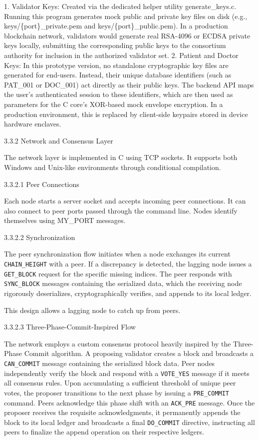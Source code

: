 \documentclass[12pt]{article}
\begin{document}
1. Validator Keys: Created via the dedicated helper utility generate\_keys.c. Running this program generates mock public and private key files on disk (e.g., keys/\{port\}\_private.pem and keys/\{port\}\_public.pem). In a production blockchain network, validators would generate real RSA-4096 or ECDSA private keys locally, submitting the corresponding public keys to the consortium authority for inclusion in the authorized validator set.
2. Patient and Doctor Keys: In this prototype version, no standalone cryptographic key files are generated for end-users. Instead, their unique database identifiers (such as PAT\_001 or DOC\_001) act directly as their public keys. The backend API maps the user's authenticated session to these identifiers, which are then used as parameters for the C core's XOR-based mock envelope encryption. In a production environment, this is replaced by client-side keypairs stored in device hardware enclaves.

3.3.2 Network and Consensus Layer

The network layer is implemented in C using TCP sockets. It supports both Windows and Unix-like environments through conditional compilation.

3.3.2.1 Peer Connections

Each node starts a server socket and accepts incoming peer connections. It can also connect to peer ports passed through the command line. Nodes identify themselves using MY\_PORT messages.

3.3.2.2 Synchronization

The peer synchronization flow initiates when a node exchanges its current \texttt{CHAIN\_HEIGHT} with a peer. If a discrepancy is detected, the lagging node issues a \texttt{GET\_BLOCK} request for the specific missing indices. The peer responds with \texttt{SYNC\_BLOCK} messages containing the serialized data, which the receiving node rigorously deserializes, cryptographically verifies, and appends to its local ledger.

This design allows a lagging node to catch up from peers.

3.3.2.3 Three-Phase-Commit-Inspired Flow

The network employs a custom consensus protocol heavily inspired by the Three-Phase Commit algorithm. A proposing validator creates a block and broadcasts a \texttt{CAN\_COMMIT} message containing the serialized block data. Peer nodes independently verify the block and respond with a \texttt{VOTE\_YES} message if it meets all consensus rules. Upon accumulating a sufficient threshold of unique peer votes, the proposer transitions to the next phase by issuing a \texttt{PRE\_COMMIT} command. Peers acknowledge this phase shift with an \texttt{ACK\_PRE} message. Once the proposer receives the requisite acknowledgments, it permanently appends the block to its local ledger and broadcasts a final \texttt{DO\_COMMIT} directive, instructing all peers to finalize the append operation on their respective ledgers.
\end{document}
